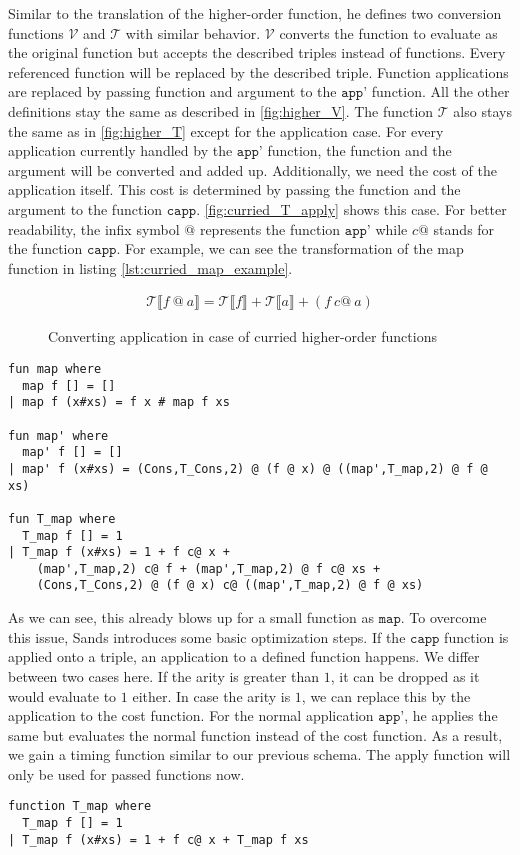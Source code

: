 Similar to the translation of the higher-order function, he defines two conversion functions $\mathcal{V}$ and $\mathcal{T}$ with similar behavior.
$\mathcal{V}$ converts the function to evaluate as the original function but accepts the described triples instead of functions.
Every referenced function will be replaced by the described triple.
Function applications are replaced by passing function and argument to the $\texttt{app'}$ function.
All the other definitions stay the same as described in \autoref{fig:higher_V}.
The function $\mathcal{T}$ also stays the same as in \autoref{fig:higher_T} except for the application case.
For every application currently handled by the $\texttt{app'}$ function, the function and the argument will be converted and added up.
Additionally, we need the cost of the application itself.
This cost is determined by passing the function and the argument to the function $\texttt{capp}$.
\autoref{fig:curried_T_apply} shows this case.
For better readability, the infix symbol $@$ represents the function $\texttt{app'}$ while $c@$ stands for the function $\texttt{capp}$.
For example, we can see the transformation of the map function in listing \ref{lst:curried_map_example}.
\begin{figure}
\begin{align*}
  \mathcal{T}\llbracket f\ @\ a\rrbracket = \mathcal{T}\llbracket f\rrbracket + \mathcal{T}\llbracket a\rrbracket + (f\ c@\ a)
\end{align*}
\caption{Converting application in case of curried higher-order functions}
\label{fig:curried_T_apply}
\end{figure}

\begin{lstlisting}[language=isabelle,mathescape=true,label=lst:curried_map_example,caption=Example translation for map function]
fun map where
  map f [] = []
| map f (x#xs) = f x # map f xs

fun map' where
  map' f [] = []
| map' f (x#xs) = (Cons,T_Cons,2) @ (f @ x) @ ((map',T_map,2) @ f @ xs)

fun T_map where
  T_map f [] = 1
| T_map f (x#xs) = 1 + f c@ x +
    (map',T_map,2) c@ f + (map',T_map,2) @ f c@ xs +
    (Cons,T_Cons,2) @ (f @ x) c@ ((map',T_map,2) @ f @ xs)
\end{lstlisting}

As we can see, this already blows up for a small function as $\texttt{map}$.
To overcome this issue, Sands introduces some basic optimization steps.
If the $\texttt{capp}$ function is applied onto a triple, an application to a defined function happens.
We differ between two cases here.
If the arity is greater than $1$, it can be dropped as it would evaluate to $1$ either.
In case the arity is $1$, we can replace this by the application to the cost function.
For the normal application $\texttt{app'}$, he applies the same but evaluates the normal function instead of the cost function.
As a result, we gain a timing function similar to our previous schema.
The apply function will only be used for passed functions now.
\begin{lstlisting}[language=isabelle,mathescape=true,caption=Optimized translation for map function]
function T_map where
  T_map f [] = 1
| T_map f (x#xs) = 1 + f c@ x + T_map f xs
\end{lstlisting}
